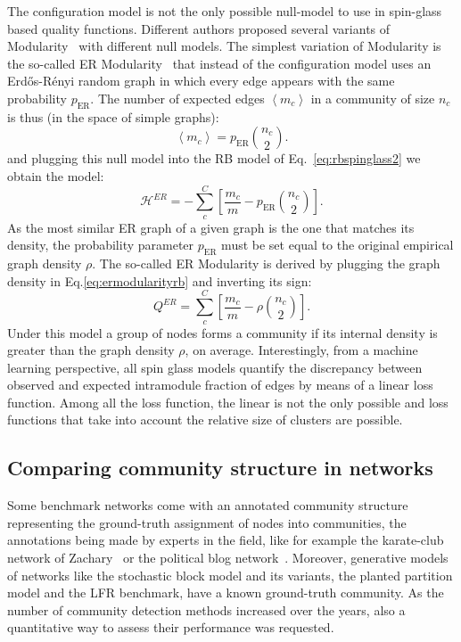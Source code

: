 The configuration model is not the only possible null-model to use in spin-glass based quality functions. Different authors proposed several variants of Modularity~\cite{ronhovde2010,ronhovde2009,traag2011} with different null models.
The simplest variation of Modularity is the so-called ER Modularity~\cite{traag2015} that instead of the configuration model uses an Erd\H{o}s-Rényi random graph in which every edge appears with the same probability $p_{\textrm{ER}}$. The number of expected edges $\left< m_c \right>$ in a community of size $n_c$ is thus (in the space of simple graphs):
\begin{equation}
\left< m_c \right> = p_{\textrm{ER}}\binom{n_c}{2}.
\end{equation}
and plugging this null model into the RB model of Eq.~\ref{eq:rbspinglass2} we obtain the model:
\begin{equation}\label{eq:ermodularityrb}
\mathcal{H}^{ER} = -\sum \limits_c^C \left[\frac{m_c}{m}  - p_{\textrm{ER}}\binom{n_c}{2} \right].
\end{equation}
As the most similar ER graph of a given graph is the one that matches its density, the probability parameter $p_{\textrm{ER}}$ must be set equal to the original empirical graph density $\rho$. The so-called ER Modularity is derived by plugging the graph density in Eq.\ref{eq:ermodularityrb} and inverting its sign: 
\begin{equation}
Q^{ER} = \sum \limits_c^C \left[\frac{m_c}{m}  - \rho \binom{n_c}{2} \right].
\end{equation}
Under this model a group of nodes forms a community if its internal density is greater than the graph density $\rho$, on average.
Interestingly, from a machine learning perspective, all spin glass models quantify the discrepancy between observed and expected intramodule fraction of edges by means of a linear loss function. Among all the loss function, the linear is not the only possible and loss functions that take into account the relative size of clusters are possible.

\subsection{Comparing community structure in networks}
Some benchmark networks come with an annotated community structure representing the ground-truth assignment of nodes into communities, the annotations being made by experts in the field, like for example the karate-club network of Zachary~\cite{zachary1977} or the political blog network~\cite{adamic2005}.
Moreover, generative models of networks like the stochastic block model and its variants, the planted partition model and the LFR benchmark, have a known ground-truth community.
As the number of community detection methods increased over the years, also a quantitative way to assess their performance was requested.

